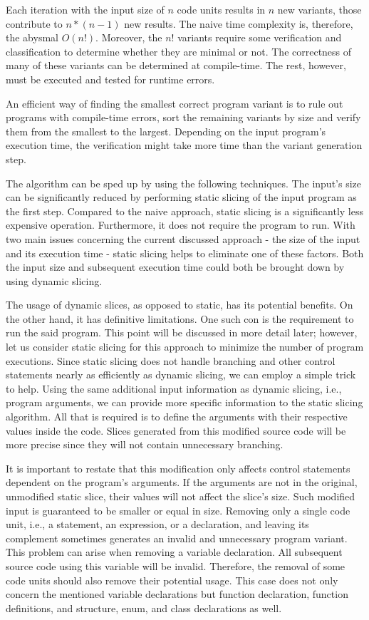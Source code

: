 Each iteration with the input size of $n$ code units results in $n$ new 
variants, those contribute to $n * (n - 1) $ new results.
The naive time complexity is, therefore, the abysmal $O(n!)$.
Moreover, the $n!$ variants require some verification and classification 
to determine whether they are minimal or not.
The correctness of many of these variants can be determined at compile-time.
The rest, however, must be executed and tested for runtime errors.

An efficient way of finding the smallest correct program variant is to rule 
out programs with compile-time errors, sort the remaining variants by size 
and verify them from the smallest to the largest.
Depending on the input program's execution time, the verification might take 
more time than the variant generation step.

The algorithm can be sped up by using the following techniques.
The input's size can be significantly reduced by performing static 
slicing of the input program as the first step.
Compared to the naive approach, static slicing is a significantly less 
expensive operation.
Furthermore, it does not require the program to run.
With two main issues concerning the current discussed approach - the size 
of the input and its execution time - static slicing helps to eliminate 
one of these factors.
Both the input size and subsequent execution time could both be brought 
down by using dynamic slicing.

The usage of dynamic slices, as opposed to static, has its potential benefits.
On the other hand, it has definitive limitations.
One such con is the requirement to run the said program.
This point will be discussed in more detail later; however, let us consider 
static slicing for this approach to minimize the number of program executions.
Since static slicing does not handle branching and other control statements 
nearly as efficiently as dynamic slicing, we can employ a simple trick 
to help.
Using the same additional input information as dynamic slicing, i.e., 
program arguments, we can provide more specific information 
to the static slicing algorithm.
All that is required is to define the arguments with their respective 
values inside the code.
Slices generated from this modified source code will be more precise 
since they will not contain unnecessary branching.

It is important to restate that this modification only affects control 
statements dependent on the program's arguments.
If the arguments are not in the original, unmodified static slice, their 
values will not affect the slice's size.
Such modified input is guaranteed to be smaller or equal in size.
Removing only a single code unit, i.e., a statement, an expression, 
or a declaration, and leaving its complement sometimes generates 
an invalid and unnecessary program variant.
This problem can arise when removing a variable declaration.
All subsequent source code using this variable will be invalid.
Therefore, the removal of some code units should also remove their potential 
usage.
This case does not only concern the mentioned variable declarations but 
function declaration, function definitions, and structure, enum, 
and class declarations as well.

